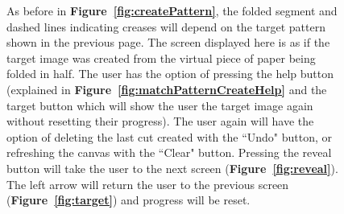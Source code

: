 \documentclass[11pt]{article}
\begin{document}
           \begin{figure}
                \begin{minipage}[c]{0.65\textwidth}
                \caption{As before in \textbf{Figure~\ref{fig:createPattern}}, the folded segment and dashed lines indicating creases will depend on the target pattern shown in the previous page. The screen displayed here is as if the target image was created from the virtual piece of paper being folded in half. The user has the option of pressing the help button (explained in \textbf{Figure~\ref{fig:matchPatternCreateHelp}} and the target button which will show the user the target image again without resetting their progress). The user again will have the option of deleting the last cut created with the ``Undo" button, or refreshing the canvas with the ``Clear" button. Pressing the reveal button will take the user to the next screen (\textbf{Figure~\ref{fig:reveal}}). 
                The left arrow will return the user to the previous screen (\textbf{Figure~\ref{fig:target}}) and progress will be reset.}
                \label{fig:matchPatternCreate}
                \end{minipage}\hfill
                \begin{minipage}[c]{0.35\textwidth}

\end{minipage}
\end{figure}
\end{document}

